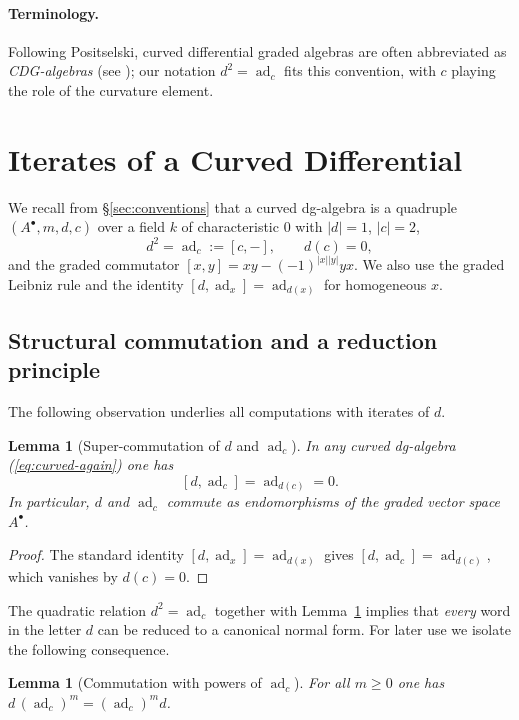 \documentclass[preprint,12pt]{elsarticle}
\newcommand{\ad}{\operatorname{ad}}
\newtheorem{lem}[thm]{Lemma}
\begin{document}
\paragraph{Terminology.}
Following Positselski, curved differential graded algebras are often abbreviated as \emph{CDG-algebras} (see \cite{Positselski2011,PositselskiBLMS2023}); our notation $d^2=\ad_c$ fits this convention, with $c$ playing the role of the curvature element.

\section{Iterates of a Curved Differential}\label{sec:iterates}

We recall from §\ref{sec:conventions} that a curved dg-algebra is a quadruple
$(A^\bullet,m,d,c)$ over a field $k$ of characteristic $0$ with $|d|=1$, $|c|=2$,
\begin{equation}\label{eq:curved-again}
d^2=\ad_c:=[c,-],\qquad d(c)=0,
\end{equation}
and the graded commutator $[x,y]=xy-(-1)^{|x||y|}yx$. We also use the graded Leibniz rule and the identity
$[d,\ad_x]=\ad_{d(x)}$ for homogeneous $x$.

\subsection{Structural commutation and a reduction principle}
The following observation underlies all computations with iterates of $d$.

\begin{lem}[Super-commutation of $d$ and $\ad_c$]\label{lem:super-commutation}
In any curved dg-algebra \emph{(}\eqref{eq:curved-again}\emph{)} one has
\[
[d,\ad_c]=\ad_{d(c)}=0.
\]
In particular, $d$ and $\ad_c$ commute as endomorphisms of the graded vector space $A^\bullet$.
\end{lem}

\begin{proof}
The standard identity $[d,\ad_x]=\ad_{d(x)}$ gives $[d,\ad_c]=\ad_{d(c)}$, which vanishes by $d(c)=0$.
\end{proof}

The quadratic relation $d^2=\ad_c$ together with Lemma~\ref{lem:super-commutation} implies that
\emph{every} word in the letter $d$ can be reduced to a canonical normal form. For later use we isolate
the following consequence.

\begin{lem}[Commutation with powers of $\ad_c$]\label{lem:commute-powers}
For all $m\ge 0$ one has $d\,(\ad_c)^m=(\ad_c)^m d$.
\end{lem}
\end{document}
